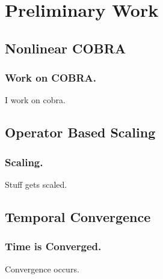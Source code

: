 \documentclass[compress]{beamer}
\begin{document}
\section[Preliminary Work]{Preliminary Work}
\subsection[COBRA]{Nonlinear COBRA}
\begin{frame}
\frametitle{Work on COBRA.}

I work on cobra.

\end{frame}
\subsection[Scaling]{Operator Based Scaling}
\begin{frame}
\frametitle{Scaling.}

Stuff gets scaled.

\end{frame}
\subsection[Convergence]{Temporal Convergence}
\begin{frame}
\frametitle{Time is Converged.}

Convergence occurs.

\end{frame}
\end{document}

